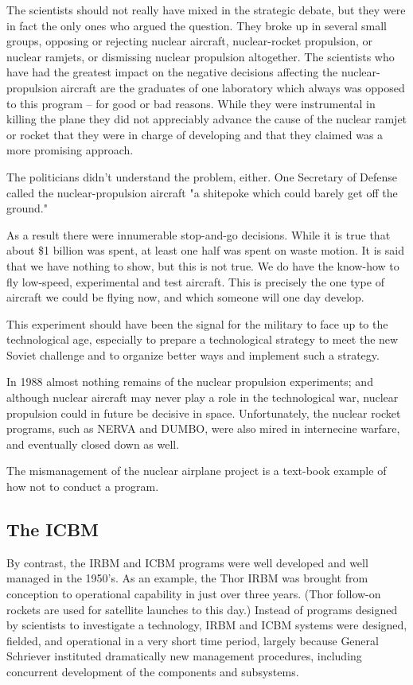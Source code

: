 The scientists should not really have mixed in the strategic debate, but they were in fact the only ones who argued the question. They broke up in several small groups, opposing or rejecting nuclear aircraft, nuclear-rocket propulsion, or nuclear ramjets, or dismissing nuclear propulsion altogether. The scientists who have had the greatest impact on the negative decisions affecting the nuclear-propulsion aircraft are the graduates of one laboratory which always was opposed to this program -- for good or bad reasons. While they were instrumental in killing the plane they did not appreciably advance the cause of the nuclear ramjet or rocket that they were in charge of developing and that they claimed was a more promising approach.

The politicians didn't understand the problem, either. One Secretary of Defense called the nuclear-propulsion aircraft "a shitepoke which could barely get off the ground."

As a result there were innumerable stop-and-go decisions. While it is true that about \$1 billion was spent, at least one half was spent on waste motion. It is said that we have nothing to show, but this is not true. We do have the know-how to fly low-speed, experimental and test aircraft. This is precisely the one type of aircraft we could be flying now, and which someone will one day develop.

This experiment should have been the signal for the military to face up to the technological age, especially to prepare a technological strategy to meet the new Soviet challenge and to organize better ways and implement such a strategy.

In 1988 almost nothing remains of the nuclear propulsion experiments; and although nuclear aircraft may never play a role in the technological war, nuclear propulsion could in future be decisive in space. Unfortunately, the nuclear rocket programs, such as NERVA and DUMBO, were also mired in internecine warfare, and eventually closed down as well.

The mismanagement of the nuclear airplane project is a text-book example of how not to conduct a program.

\subsection{The ICBM}
By contrast, the IRBM and ICBM programs were well developed and well managed in the 1950's. As an example, the Thor IRBM was brought from conception to operational capability in just over three years. (Thor follow-on rockets are used for satellite launches to this day.) Instead of programs designed by scientists to investigate a technology, IRBM and ICBM systems were designed, fielded, and operational in a very short time period, largely because General Schriever instituted dramatically new management procedures, including concurrent development of the components and subsystems.

